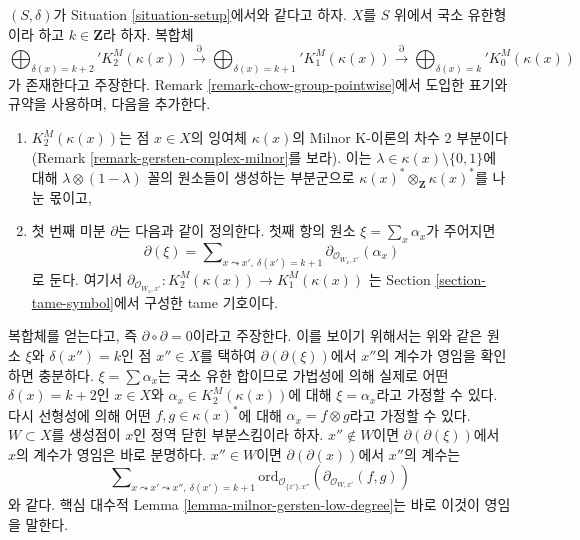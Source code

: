 \begin{remark}
\label{remark-higher-chow-pointwise}
$(S, \delta)$가 Situation \ref{situation-setup}에서와 같다고 하자.
$X$를 $S$ 위에서 국소 유한형이라 하고 $k \in \mathbf{Z}$라 하자.
복합체
$$
\bigoplus\nolimits_{\delta(x) = k + 2}' K_2^M(\kappa(x))
\xrightarrow{\partial}
\bigoplus\nolimits_{\delta(x) = k + 1}' K_1^M(\kappa(x))
\xrightarrow{\partial}
\bigoplus\nolimits_{\delta(x) = k}' K_0^M(\kappa(x))
$$
가 존재한다고 주장한다. Remark \ref{remark-chow-group-pointwise}에서
도입한 표기와 규약을 사용하며, 다음을 추가한다.
\begin{enumerate}
\item $K_2^M(\kappa(x))$는 점 $x \in X$의 잉여체 $\kappa(x)$의 Milnor
K-이론의 차수 $2$ 부분이다(Remark \ref{remark-gersten-complex-milnor}를
보라). 이는 $\lambda \in \kappa(x) \setminus \{0, 1\}$에 대해
$\lambda \otimes (1 - \lambda)$ 꼴의 원소들이 생성하는 부분군으로
$\kappa(x)^* \otimes_\mathbf{Z} \kappa(x)^*$를 나눈 몫이고,
\item 첫 번째 미분 $\partial$는 다음과 같이 정의한다. 첫째 항의 원소
$\xi = \sum_x \alpha_x$가 주어지면
$$
\partial(\xi) = \sum\nolimits_{x \leadsto x',\ \delta(x') = k + 1}
\partial_{\mathcal{O}_{W_x, x'}}(\alpha_x)
$$
로 둔다. 여기서
$\partial_{\mathcal{O}_{W_x, x'}} : K_2^M(\kappa(x)) \to K_1^M(\kappa(x))$
는 Section \ref{section-tame-symbol}에서 구성한 tame 기호이다.
\end{enumerate}
복합체를 얻는다고, 즉 $\partial \circ \partial = 0$이라고 주장한다.
이를 보이기 위해서는 위와 같은 원소 $\xi$와
$\delta(x'') = k$인 점 $x'' \in X$를 택하여
$\partial(\partial(\xi))$에서 $x''$의 계수가 영임을 확인하면 충분하다.
$\xi = \sum \alpha_x$는 국소 유한 합이므로 가법성에 의해 실제로 어떤
$\delta(x) = k + 2$인 $x \in X$와
$\alpha_x \in K_2^M(\kappa(x))$에 대해 $\xi = \alpha_x$라고 가정할 수
있다. 다시 선형성에 의해 어떤 $f, g \in \kappa(x)^*$에 대해
$\alpha_x = f \otimes g$라고 가정할 수 있다. $W \subset X$를 생성점이
$x$인 정역 닫힌 부분스킴이라 하자. $x'' \not \in W$이면
$\partial(\partial(\xi))$에서 $x$의 계수가 영임은 바로 분명하다.
$x'' \in W$이면 $\partial(\partial(x))$에서 $x''$의 계수는
$$
\sum\nolimits_{x \leadsto x' \leadsto x'',\ \delta(x') = k + 1}
\text{ord}_{\mathcal{O}_{\overline{\{x'\}}, x''}}(
\partial_{\mathcal{O}_{W, x'}}(f, g))
$$
와 같다. 핵심 대수적 Lemma \ref{lemma-milnor-gersten-low-degree}는 바로
이것이 영임을 말한다.
\end{remark}

